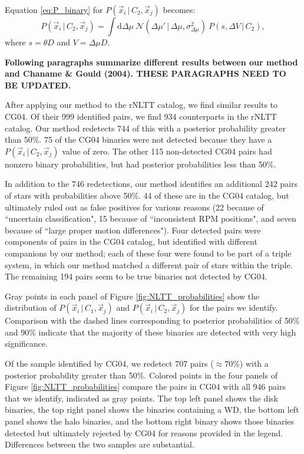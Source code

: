 \documentclass[usenatbib]{mnras}
\newcommand{\given}{\,|\,}
\newcommand{\dd}{\mathrm{d}}
\begin{document}
Equation \ref{eq:P_binary} for $P(\vec{x}_i \given C_2, \vec{x}_j)$ becomes:
\begin{equation}
P(\vec{x}_i \given C_2, \vec{x}_j) = \int \dd \Delta \mu\ 
\mathcal{N}( \Delta \mu' \given \Delta \mu, \sigma^2_{\Delta \mu} )\
P(s, \Delta V \given C_2),
\label{eq:P_binary_rNLTT}
\end{equation}
where $s = \theta D$ and $V = \Delta \mu D$. 


{\bf Following paragraphs summarize different results between our method and Chaname \& Gould (2004). THESE PARAGRAPHS NEED TO BE UPDATED.}

After applying our method to the rNLTT catalog, we find similar results to CG04. Of their 999 identified pairs, we find 934 counterparts in the rNLTT catalog. Our method redetects 744 of this with a posterior probability greater than 50\%. 75 of the CG04 binaries were not detected because they have a $P(\vec{x}_i \given C_2, \vec{x}_j)$ value of zero. The other 115 non-detected CG04 pairs had nonzero binary probabilities, but had posterior probabilities less than 50\%. 



In addition to the 746 redetections, our method identifies an additional 242 pairs of stars with probabilities above 50\%. 44 of these are in the CG04 catalog, but ultimately ruled out as false positives for various reasons (22 because of ``uncertain classification", 15 because of ``inconsistent RPM positions", and seven because of ``large proper motion differences"). Four detected pairs were components of pairs in the CG04 catalog, but identified with different companions by our method; each of these four were found to be part of a triple system, in which our method matched a different pair of stars within the triple. The remaining 194 pairs seem to be true binaries not detected by CG04. 



Gray points in each panel of Figure \ref{fig:NLTT_probabilities} show the distribution of $P(\vec{x}_i \given C_1, \vec{x}_j)$ and $P(\vec{x}_i \given C_2, \vec{x}_j)$ for the pairs we identify. Comparison with the dashed lines corresponding to posterior probabilities of 50\% and 90\% indicate that the majority of these binaries are detected with very high significance. 

Of the sample identified by CG04, we redetect 707 pairs ($\approx 70$\%) with a posterior probability greater than 50\%. Colored points in the four panels of Figure \ref{fig:NLTT_probabilities} compare the pairs in CG04 with all 946 pairs that we identify, indicated as gray points. The top left panel shows the disk binaries, the top right panel shows the binaries containing a WD, the bottom left panel shows the halo binaries, and the bottom right binary shows those binaries detected but ultimately rejected by CG04 for reasons provided in the legend. Differences between the two samples are substantial.  
\end{document}
